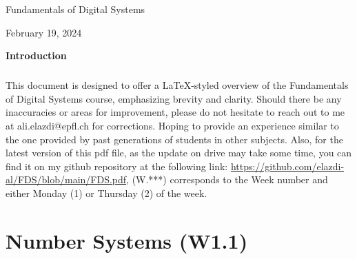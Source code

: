 \documentclass[12pt,openany]{book}
\begin{document}
\begin{titlepage}
	\centering
	\vspace*{1cm}

	\Huge
	Fundamentals of Digital Systems
	\vspace{10px}
	\newline
	\text{ \large  }
	
	
	    
	\vfill
	\large
	February 19, 2024
	
	    
\end{titlepage}
\begin{center}
	\vspace*{1cm}
	\textbf{Introduction}
	\newline
	\paragraph[short]{}{This document is designed to offer a LaTeX-styled overview of the Fundamentals of Digital Systems course, emphasizing brevity and clarity. Should there be any inaccuracies or areas for improvement, please do not hesitate to reach out to me at ali.elazdi@epfl.ch for corrections. Hoping to provide an experience similar to the one provided by past generations of students in other subjects. Also, for the latest version of this pdf file, as the update on drive may take some time, you can find it on my github repository at the following link: \url{https://github.com/elazdi-al/FDS/blob/main/FDS.pdf}, (W.***) corresponds to the Week number and either Monday (1) or Thursday (2) of the week.}
\end{center}


\tableofcontents



\mainmatter%
\chapter{Number Systems (W1.1)}


\end{document}
